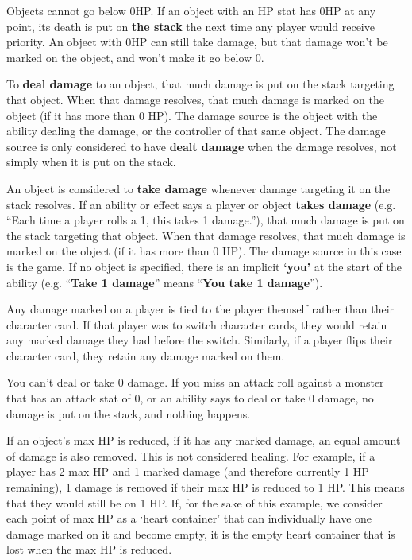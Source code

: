 \documentclass[10pt, a4paper, twoside]{article} %
\begin{document}
    Objects cannot go below 0HP. If an object with an HP stat has 0HP at any point, its death is put on \textbf{the stack} the next time any player would receive priority. An object with 0HP can still take damage, but that damage won’t be marked on the object, and won’t make it go below 0.

    To \textbf{deal damage} to an object, that much damage is put on the stack targeting that object. When that damage resolves, that much damage is marked on the object (if it has more than 0 HP). The damage source is the object with the ability dealing the damage, or the controller of that same object. The damage source is only considered to have \textbf{dealt damage} when the damage resolves, not simply when it is put on the stack.

    An object is considered to \textbf{take damage} whenever damage targeting it on the stack resolves. If an ability or effect says a player or object \textbf{takes damage} (e.g. “Each time a player rolls a 1, this takes 1 damage.”), that much damage is put on the stack targeting that object. When that damage resolves, that much damage is marked on the object (if it has more than 0 HP). The damage source in this case is the game. If no object is specified, there is an implicit \textbf{‘you’} at the start of the ability (e.g. “\textbf{Take 1 damage}” means “\textbf{You take 1 damage}”).

    Any damage marked on a player is tied to the player themself rather than their character card. If that player was to switch character cards, they would retain any marked damage they had before the switch. Similarly, if a player flips their character card, they retain any damage marked on them.

    You can’t deal or take 0 damage. If you miss an attack roll against a monster that has an attack stat of 0, or an ability says to deal or take 0 damage, no damage is put on the stack, and nothing happens.

    If an object’s max HP is reduced, if it has any marked damage, an equal amount of damage is also removed. This is not considered healing. For example, if a player has 2 max HP and 1 marked damage (and therefore currently 1 HP remaining), 1 damage is removed if their max HP is reduced to 1 HP. This means that they would still be on 1 HP. If, for the sake of this example, we consider each point of max HP as a ‘heart container’ that can individually have one damage marked on it and become empty, it is the empty heart container that is lost when the max HP is reduced.
\end{document}
